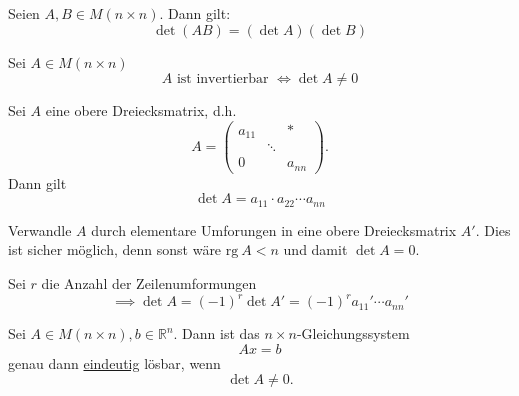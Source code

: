 \begin{definition}
    [Multiplikationssatz] Seien $A,B\in M(n\times n)$. Dann gilt:
    \[
        \det(AB)=(\det A)(\det B)
    \]
\end{definition}
\begin{definition}
    Sei $A\in M(n\times n)$
    \[
        A \text{ ist invertierbar }\Longleftrightarrow \det A \neq 0
    \]
\end{definition}
\begin{definition}
    Sei $A$ eine obere Dreiecksmatrix, d.h.
    \[
    A=\begin{pmatrix}
        a_{11} & & *\\
         & \ddots\\
        0 & & a_{nn}
    \end{pmatrix}
    .\]
    Dann gilt
    \[
        \det A = a_{11}\cdot a_{22}\cdots a_{nn}
    \]
\end{definition}
\begin{definition}
     Verwandle $A$ durch elementare Umforungen in eine obere
    Dreiecksmatrix $A'$. Dies ist sicher möglich, denn sonst wäre $\mathrm{rg}\ A < n$ und damit $\det A = 0$.

    Sei $r$ die Anzahl der Zeilenumformungen
    \[
        \implies \det A = (-1)^r\det A'= (-1)^r a_{11}'\cdots a_{nn}'
    \]
\end{definition}
\begin{theorem}
    Sei $A\in M(n\times n), b\in \mathbb{R}^n$. Dann ist das $n\times n$-Gleichungssystem
    \[
        Ax = b
    \] genau dann \underline{eindeutig} lösbar, wenn
    \[
        \det A \neq 0.
    \]
\end{theorem}